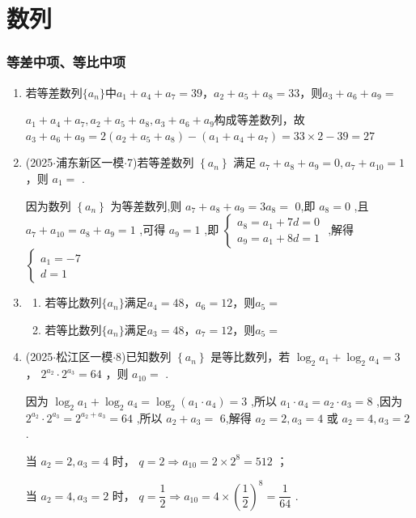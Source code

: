 \chapter*{数列}
\subsection*{等差中项、等比中项}
\begin{enumerate}
    \item 若等差数列$\{a_n\}$中$a_1 + a_4 + a_7 = 39$，$a_2 + a_5 + a_8 = 33$，则$a_3 + a_6 + a_9 = $
    \begin{jieda}
        $a_1 + a_4 + a_7, a_2 + a_5 + a_8, a_3 + a_6 + a_9$构成等差数列，故$a_3 + a_6 + a_9 = 2(a_2 + a_5 + a_8) - (a_1 + a_4 + a_7) = 33 \times 2 - 39 = 27$
    \end{jieda}
    \item (2025$\cdot$浦东新区一模$\cdot$7)若等差数列 $\left\{  {a}_{n}\right\}$ 满足 ${a}_{7} + {a}_{8} + {a}_{9} = 0,{a}_{7} + {a}_{10} = 1$ ，则 ${a}_{1} =$ .
    \begin{jieda}
        因为数列 $\left\{  {a}_{n}\right\}$ 为等差数列,则 ${a}_{7} + {a}_{8} + {a}_{9} = 3{a}_{8} =$ 0,即 ${a}_{8} = 0$ ,且 ${a}_{7} + {a}_{10} = {a}_{8} + {a}_{9} = 1$ ,可得 ${a}_{9} = 1$ ,即 $\left\{  \begin{array}{l} {a}_{8} = {a}_{1} + {7d} = 0 \\  {a}_{9} = {a}_{1} + {8d} = 1 \end{array}\right.$ ,解得 $\left\{  \begin{array}{l} {a}_{1} =  - 7 \\  d = 1 \end{array}\right.$
    \end{jieda}
    \item 
    \begin{enumerate}
        \item 若等比数列$\{a_n\}$满足$a_4 = 48$，$a_6 = 12$，则$a_5 = $
        \item 若等比数列$\{a_n\}$满足$a_3 = 48$，$a_7 = 12$，则$a_5 = $
    \end{enumerate}
    \item (2025$\cdot$松江区一模$\cdot$8)已知数列 $\left\{  {a}_{n}\right\}$ 是等比数列，若 ${\log }_{2}{a}_{1} + {\log }_{2}{a}_{4} = 3$ ， ${{2}}^{{a}_{2}} \cdot  {2}^{{a}_{3}} = {64}$ ，则 ${a}_{10} =$ .
    \begin{jieda}
        因为 ${\log }_{2}{a}_{1} + {\log }_{2}{a}_{4} = {\log }_{2}\left( {{a}_{1} \cdot  {a}_{4}}\right)  = 3$ ,所以 ${a}_{1} \cdot  {a}_{4} = {a}_{2} \cdot  {a}_{3} = 8$ ,因为 ${2}^{{a}_{2}} \cdot  {2}^{{a}_{3}} = {2}^{{a}_{2} + {a}_{3}} = {64}$ ,所以 ${a}_{2} + {a}_{3} =$ 6,解得 ${a}_{2} = 2,{a}_{3} = 4$ 或 ${a}_{2} = 4,{a}_{3} = 2$ .

          当 ${a}_{2} = 2,{a}_{3} = 4$ 时， $q = 2 \Longrightarrow  {a}_{10} = 2 \times  {2}^{8} = {512}$ ；

          当 ${a}_{2} = 4,{a}_{3} = 2$ 时， $q = \dfrac{1}{2} \Longrightarrow  {a}_{10} = 4 \times  {\left( \dfrac{1}{2}\right) }^{8} = \dfrac{1}{64}$ .
    \end{jieda}
\end{enumerate}
